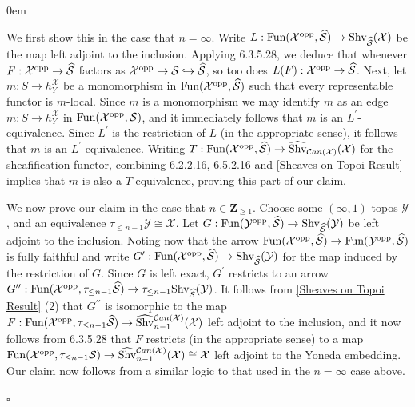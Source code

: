 \documentclass[10pt]{article}
\newcommand{\mS}{\mathcal S}
\newcommand{\C}{\mathcal C}
\newcommand{\cX}{\mathcal{X}}
\newcommand{\cY}{\mathcal{Y}}
\newcommand{\ZZ}{\mathbb{Z}}
\def\ZZ{{\mathbf Z}}
\renewcommand{\qed}{\hfill$\square$}
\renewenvironment{proof}{\begin{addmargin}[1em]{0em}\begin{newproof}}{\end{newproof}\end{addmargin}\qed}
\theoremstyle{witharg}
\theoremstyle{witharg}
\theoremstyle{witharg2}
\begin{document}
\begin{proof}

    We first show this in the case that $n=\infty$. Write $L:\textnormal{Fun}(\cX^{\textnormal{opp}},\widehat{\mS})\rightarrow \textnormal{Shv}_{\widehat{\mS}}(\cX)$ be the map left adjoint to the inclusion. Applying  6.3.5.28, we deduce that whenever $F:\cX^{\textnormal{opp}}\rightarrow \widehat{\mS}$ factors as $\cX^{\textnormal{opp}}\rightarrow \mS\hookrightarrow \widehat{\mS}$, so too does $L(F):\cX^{\textnormal{opp}}\rightarrow \widehat{\mS}$. Next, let $m:S\rightarrow h^\cX_Y$ be a monomorphism in $\textnormal{Fun}(\cX^{\textnormal{opp}},\widehat{\mS})$ such that every representable functor is $m$-local. Since $m$ is a monomorphism we may identify $m$ as an edge $m:S\rightarrow h^\cX_Y$ in $\textnormal{Fun}(\cX^{\textnormal{opp}},\mS)$, and it immediately follows that $m$ is an $L^\prime$-equivalence. Since $L^\prime$ is the restriction of $L$ (in the appropriate sense), it follows that $m$ is an $L^\prime$-equivalence. Writing $T:\textnormal{Fun}(\cX^{\textnormal{opp}},\widehat{\mS})\rightarrow \widehat{\textnormal{Shv}}_{\C an(\cX)}(\cX)$ for the sheafification functor, combining  6.2.2.16,  6.5.2.16 and \ref{Sheaves on Topoi Result} implies that $m$ is also a $T$-equivalence, proving this part of our claim. 


    We now prove our claim in the case that $n\in \ZZ_{\geq 1}$. Choose some $(\infty,1)$-topos $\cY$, and an equivalence $\tau_{\leq n-1}\cY\cong \cX$. Let $G:\textnormal{Fun}(\cY^{\textnormal{opp}},\widehat{\mS})\rightarrow \textnormal{Shv}_{\widehat{\mS}}(\cY)$ be left adjoint to the inclusion. Noting now that the arrow $\textnormal{Fun}(\cX^{\textnormal{opp}},\widehat{\mS})\rightarrow \textnormal{Fun}(\cY^{\textnormal{opp}},\widehat{\mS})$ is fully faithful and write $G^\prime:\textnormal{Fun}(\cX^{\textnormal{opp}},\widehat{\mS})\rightarrow \textnormal{Shv}_{\widehat{\mS}}(\cY)$ for the map induced by the restriction of $G$. Since $G$ is left exact, $G^\prime$ restricts to an arrow $G^{\prime\prime}:\textnormal{Fun}(\cX^{\textnormal{opp}},\tau_{\leq n-1}\widehat{\mS})\rightarrow \tau_{\leq n-1}\textnormal{Shv}_{\widehat{\mS}}(\cY)$. It follows from \ref{Sheaves on Topoi Result} (2) that $G^{\prime\prime}$ is isomorphic to the map $F:\textnormal{Fun}(\cX^{\textnormal{opp}},\tau_{\leq n-1}\widehat{\mS})\rightarrow \widehat{\textnormal{Shv}}\vphantom{}^{\C an(\cX)}_{n-1}(\cX)$ left adjoint to the inclusion, and it now follows from  6.3.5.28 that $F$ restricts (in the appropriate sense) to a map $\textnormal{Fun}(\cX^{\textnormal{opp}},\tau_{\leq n-1}\mS)\rightarrow \widehat{\textnormal{Shv}}\vphantom{}_{n-1}^{\C an(\cX)}(\cX)\cong \cX$ left adjoint to the Yoneda embedding. Our claim now follows from a similar logic to that used in the $n=\infty$ case above. 
    
\end{proof}
\end{document}

